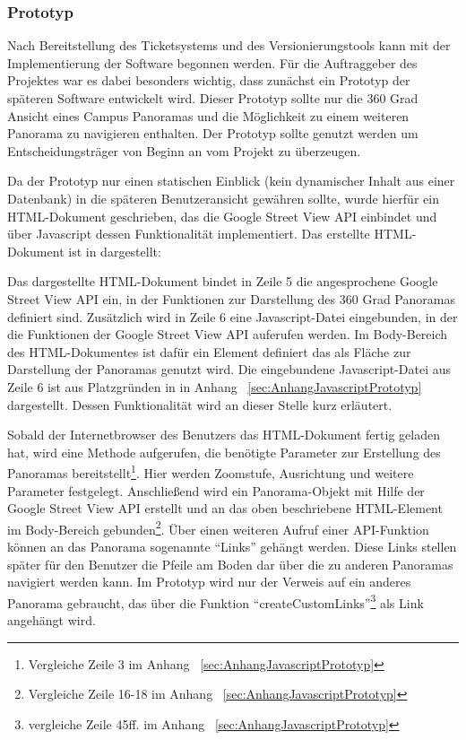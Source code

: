 \subsubsection{Prototyp}
\label{sec:Prototyp}

Nach Bereitstellung des Ticketsystems und des Versionierungstools kann mit der Implementierung der Software begonnen werden. Für die Auftraggeber des Projektes war es dabei besonders wichtig, dass zunächst ein Prototyp der späteren Software entwickelt wird. Dieser Prototyp sollte nur die 360 Grad Ansicht eines Campus Panoramas und die Möglichkeit zu einem weiteren Panorama zu navigieren enthalten. Der Prototyp sollte genutzt werden um Entscheidungsträger von Beginn an vom Projekt zu überzeugen.

Da der Prototyp nur einen statischen Einblick (kein dynamischer Inhalt aus einer Datenbank) in die späteren Benutzeransicht gewähren sollte, wurde hierfür ein HTML-Dokument geschrieben, das die Google Street View API einbindet und über Javascript dessen Funktionalität implementiert. Das erstellte HTML-Dokument ist in  dargestellt:



Das dargestellte HTML-Dokument bindet in Zeile 5 die angesprochene Google Street View API ein, in der Funktionen zur Darstellung des 360 Grad Panoramas definiert sind. Zusätzlich wird in Zeile 6 eine Javascript-Datei eingebunden, in der die Funktionen der Google Street View API auferufen werden. Im Body-Bereich des HTML-Dokumentes ist dafür ein Element definiert das als Fläche zur Darstellung der Panoramas genutzt wird. Die eingebundene Javascript-Datei aus Zeile 6 ist aus Platzgründen in  in Anhang ~\ref{sec:AnhangJavascriptPrototyp} dargestellt. Dessen Funktionalität wird an dieser Stelle kurz erläutert.

Sobald der Internetbrowser des Benutzers das HTML-Dokument fertig geladen hat, wird eine Methode aufgerufen, die benötigte Parameter zur Erstellung des Panoramas bereitstellt\footnote{Vergleiche Zeile 3 im Anhang ~\ref{sec:AnhangJavascriptPrototyp}}. Hier werden Zoomstufe, Ausrichtung und weitere Parameter festgelegt. Anschließend wird ein Panorama-Objekt mit Hilfe der Google Street View API erstellt und an das oben beschriebene HTML-Element im Body-Bereich gebunden\footnote{Vergleiche Zeile 16-18 im Anhang ~\ref{sec:AnhangJavascriptPrototyp}}. Über einen weiteren Aufruf einer API-Funktion können an das Panorama sogenannte "`Links"' gehängt werden. Diese Links stellen später für den Benutzer die Pfeile am Boden dar über die zu anderen Panoramas navigiert werden kann. Im Prototyp wird nur der Verweis auf ein anderes Panorama gebraucht, das über die Funktion "`createCustomLinks"'\footnote{vergleiche Zeile 45ff. im Anhang ~\ref{sec:AnhangJavascriptPrototyp}} als Link angehängt wird.

